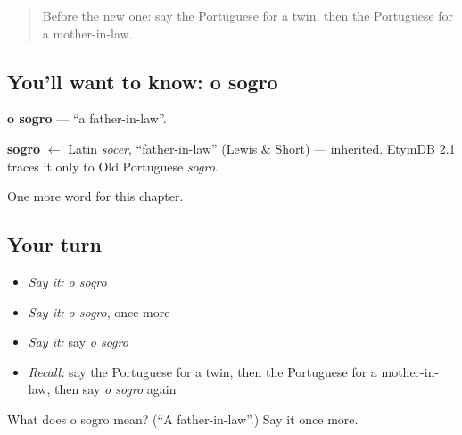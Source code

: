 \begin{quote}
Before the new one: say the Portuguese for a twin, then the Portuguese for a mother-in-law.
\end{quote}

\subsection*{You'll want to know: o sogro}
\textbf{o sogro} — \textquotedblleft{}a father-in-law\textquotedblright{}.

\begin{cousinweb}
\textbf{sogro} $\leftarrow$ Latin \emph{socer}, \textquotedblleft{}father-in-law\textquotedblright{} (Lewis \& Short) — inherited. EtymDB 2.1 traces it only to Old Portuguese \emph{sogro}.
\end{cousinweb}

\begin{grammarlens}[title={What you've built}]
One more word for this chapter.
\end{grammarlens}

\subsection*{Your turn}
\begin{itemize}
\raggedright
  \item \emph{Say it:} \emph{o sogro}
  \item \emph{Say it:} \emph{o sogro}, once more
  \item \emph{Say it:} say \emph{o sogro}
  \item \emph{Recall:} say the Portuguese for a twin, then the Portuguese for a mother-in-law, then say \emph{o sogro} again
\end{itemize}

\begin{tcolorbox}[breakable,colback=teal!4,colframe=teal!35!black,title={Before you move on}]
What does o sogro mean? (\textquotedblleft{}A father-in-law\textquotedblright{}.) Say it once more.
\end{tcolorbox}
